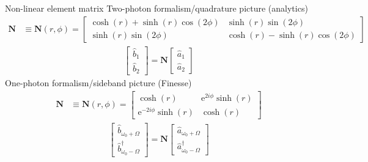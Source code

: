 \documentclass[12pt]{beamer}
\begin{document}
\begin{frame}{Non-linear element matrix}
Two-photon formalism/quadrature picture (analytics)
{\footnotesize
\begin{align}
\mathbf{N} &\equiv \mathbf{N}(r, \phi) = \begin{bmatrix} \cosh(r) + \sinh(r) \cos(2\phi) & \sinh(r) \sin(2\phi) \\ 
                                            \sinh(r) \sin(2\phi) & \cosh(r) - \sinh(r) \cos(2\phi)
                                            \end{bmatrix}
\end{align}
}
\vspace{-0.5cm}
\begin{align}
\begin{bmatrix}
\hat{b}_{1} \\
\hat{b}_{2}  
\end{bmatrix} = \mathbf{N} \begin{bmatrix}
\hat{a}_{1} \\
\hat{a}_{2}
\end{bmatrix}
\end{align}
One-photon formalism/sideband picture (Finesse)
{\footnotesize
\begin{align}
\mathbf{N} &\equiv \mathbf{N}(r, \phi) = \begin{bmatrix} \cosh(r) & \text{e}^{2i\phi} \sinh(r) \\ 
                              \text{e}^{-2i\phi} \sinh(r) & \cosh(r)
                     \end{bmatrix}
\end{align}
}
\vspace{-0.5cm}
\begin{align}
\begin{bmatrix}
\hat{b}_{\omega_0 + \Omega} \\
\hat{b}^\dagger_{\omega_0 - \Omega}  
\end{bmatrix} = \mathbf{N} \begin{bmatrix}
\hat{a}_{\omega_0 + \Omega} \\
\hat{a}^\dagger_{\omega_0 - \Omega}
\end{bmatrix}
\end{align}

\end{frame}
\end{document}
